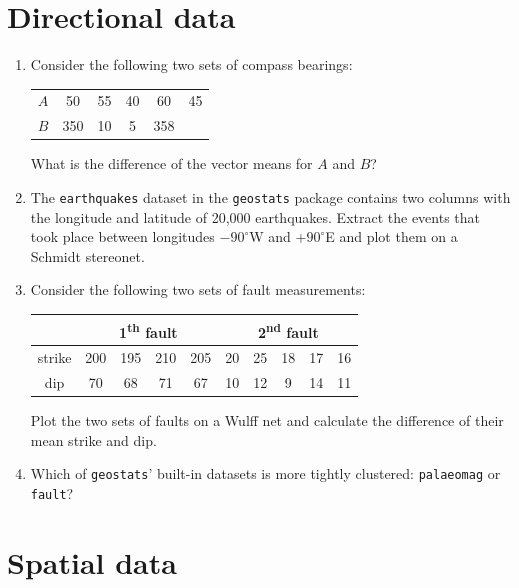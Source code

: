 \section{Directional data}
\label{sec:ex-directional}

\begin{enumerate}

\item Consider the following two sets of compass bearings:

  \begin{tabular}{c|ccccc}
    $A$ & 50 & 55 & 40 & 60 & 45 \\
    $B$ & 350 & 10 & 5 & 358 & 
  \end{tabular}

  What is the difference of the vector means for $A$ and $B$?

\item The \texttt{earthquakes} dataset in the \texttt{geostats}
  package contains two columns with the longitude and latitude of
  20,000 earthquakes.  Extract the events that took place between
  longitudes $-90^\circ$W and +$90^\circ$E and plot them on a Schmidt
  stereonet.

\item Consider the following two sets of fault measurements:

  \begin{tabular}{c|cccc|ccccc}
    ~ & \multicolumn{4}{c|}{1\textsuperscript{th} fault} &
        \multicolumn{5}{c}{2\textsuperscript{nd} fault} \\ \hline
    strike & 200 & 195 & 210 & 205 & 20 & 25 & 18 & 17 & 16 \\
    dip    & 70  & 68  & 71  & 67 & 10 & 12 & 9  & 14 & 11
  \end{tabular}

  Plot the two sets of faults on a Wulff net and calculate the
  difference of their mean strike and dip.

\item Which of \texttt{geostats}' built-in datasets is more tightly
  clustered: \texttt{palaeomag} or \texttt{fault}?
  
\end{enumerate}

\section{Spatial data}
\label{sec:ex-spatial}

